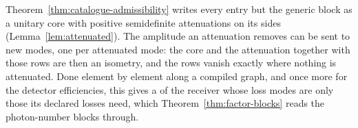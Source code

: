 
Theorem~\ref{thm:catalogue-admissibility} writes every entry but the generic
block as a unitary core with positive semidefinite attenuations on its sides
(Lemma~\ref{lem:attenuated}). The amplitude an attenuation removes can be
sent to new modes, one per attenuated mode: the core and the attenuation
together with those rows are then an isometry, and the rows vanish exactly
where nothing is attenuated. Done element by element along a compiled graph,
and once more for the detector efficiencies, this gives a
 of the receiver whose loss modes are only those its
declared losses need, which Theorem~\ref{thm:factor-blocks} reads the
photon-number blocks through.

